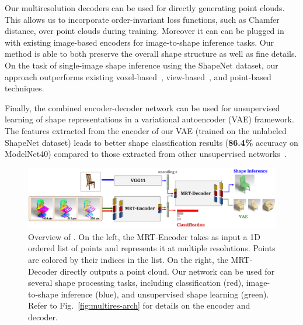 Our multiresolution decoders can be used for directly generating point clouds.
This allows us to incorporate order-invariant loss functions, such as Chamfer distance, over point clouds during training. 
Moreover it can can be plugged in with existing image-based encoders for image-to-shape inference tasks.
Our method is able to both preserve the overall shape structure as well as fine details. 
On the task of single-image shape inference using the ShapeNet dataset, our approach outperforms existing voxel-based~\cite{choy20163d}, view-based~\cite{lin2018learning}, and point-based~\cite{fan2016point} techniques.

Finally, the combined encoder-decoder network can be used for unsupervised learning of shape representations in a variational autoencoder (VAE) framework. The features extracted from the encoder of our VAE (trained on the unlabeled ShapeNet dataset) leads to better shape classification results (\textbf{86.4\%} accuracy on ModelNet40) compared to those extracted from other unsupervised networks~\cite{3dgan}.

\begin{figure}[t!]
\centering
\includegraphics[width=1.0\linewidth]{imgs/visabstract1.pdf}
\vspace{-20pt}
	\caption{\small \label{fig:multires-abs}
  Overview of \mrtnet. On the left, the MRT-Encoder takes as input a 1D ordered list of points and represents it at multiple resolutions. Points are colored by their indices in the list. On the right, the MRT-Decoder directly outputs a point cloud. Our network can be used for several shape processing tasks, including classification (red), image-to-shape inference (blue), and unsupervised shape learning (green). Refer to Fig.~\ref{fig:multires-arch} for details on the encoder and decoder.}
\vspace{-16pt}
\end{figure}





